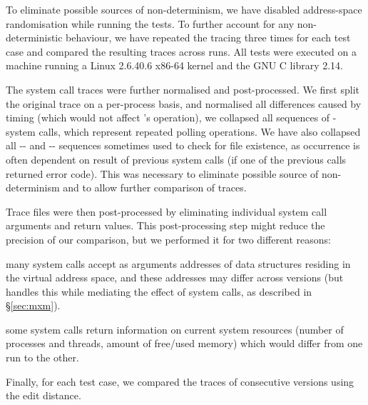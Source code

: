 To eliminate possible sources of non-determinism, we have disabled
address-space randomisation while running the tests. To further account for any
non-deterministic behaviour, we have repeated the tracing three times for each
test case and compared the resulting traces across runs.  All tests were
executed on a machine running a Linux 2.6.40.6 x86-64 kernel and the GNU C
library 2.14.

The system call traces were further normalised and post-processed.  We
first split the original trace on a per-process basis, and
normalised all differences caused by timing (which would not
affect \mx's operation), \eg we collapsed all sequences of
- system calls, which represent repeated
polling operations.
%
%
We have also collapsed all
-- and
-- sequences sometimes
used to check for file existence, as occurrence is often dependent
on result of previous system calls (\ie if one of the previous
calls returned  error code). This was necessary to
eliminate possible source of non-determinism and to allow further
comparison of traces.

Trace files were then post-processed by eliminating individual system
call arguments and return values.  This post-processing step might
reduce the precision of our comparison, but we performed it
for two different reasons:%
\begin{inparaenum}[(1)]
\item many system calls accept as arguments addresses of data structures
residing in the virtual address space, and these addresses may differ
across versions (but \mx handles this while mediating the effect of
system calls, as described in \S\ref{sec:mxm}).

\item some system calls return information on current system resources
(\eg number of processes and threads, amount of free/used memory)
which would differ from one run to the other.
\end{inparaenum}
%
Finally, 
for each test case, we compared the traces of consecutive \lighttpd
versions using the edit distance.

